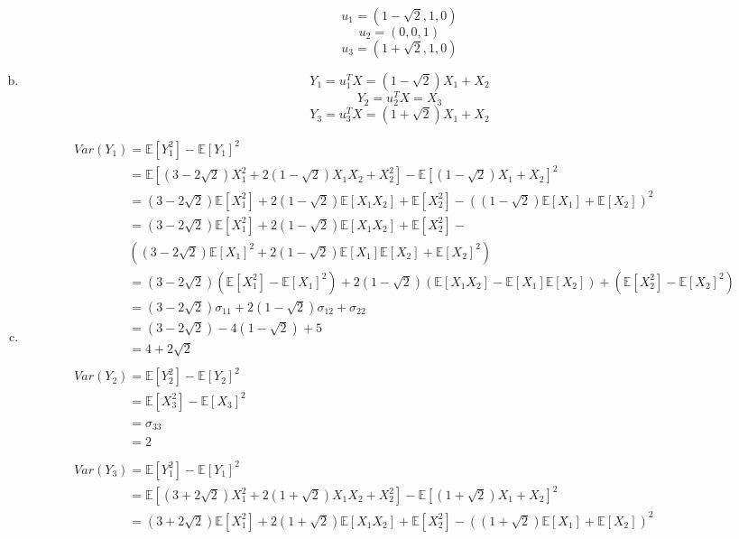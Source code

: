 \documentclass[11pt]{article}
\begin{document}
\begin{enumerate}[(a)]
		 \[u_1 = (1 - \sqrt{2}, 1, 0)\]
		 \[u_2 = (0, 0, 1)\]
		 \[u_3 = (1 + \sqrt{2}, 1, 0)\]
		\item 
		\[Y_1 = u^T_1 X = (1 - \sqrt{2})X_1 + X_2\]
		\[Y_2 = u^T_2 X = X_3\]
		\[Y_3 = u^T_3 X = (1 + \sqrt{2})X_1 + X_2\]
		\item
		\begin{align}
			&Var(Y_1) = \mathbb{E}[Y_1^2] - \mathbb{E}[Y_1]^2\nonumber\\ 
			&\phantom{Var(Y_1)} = \mathbb{E}[(3 - 2\sqrt{2})X_1^2 + 2(1 - \sqrt{2})X_1X_2 + X^2_2] - \mathbb{E}[(1 - \sqrt{2})X_1 + X_2]^2\nonumber\\
			&\phantom{Var(Y_1)} = (3 - 2\sqrt{2})\mathbb{E}[X_1^2] + 2(1 - \sqrt{2})\mathbb{E}[X_1X_2] + \mathbb{E}[X^2_2] - ((1 - \sqrt{2})\mathbb{E}[X_1] + \mathbb{E}[X_2])^2\nonumber\\
			&\phantom{Var(Y_1)} = (3 - 2\sqrt{2})\mathbb{E}[X_1^2] + 2(1 - \sqrt{2})\mathbb{E}[X_1X_2] + \mathbb{E}[X^2_2] - \nonumber\\
			&\phantom{Var(Y_1)} ((3 - 2\sqrt{2})\mathbb{E}[X_1]^2 + 2(1 - \sqrt{2})\mathbb{E}[X_1]\mathbb{E}[X_2] + \mathbb{E}[X_2]^2)\nonumber\\
			&\phantom{Var(Y_1)} = (3 - 2\sqrt{2})(\mathbb{E}[X^2_1] - \mathbb{E}[X_1]^2) + 2(1 - \sqrt{2})(\mathbb{E}[X_1X_2] - \mathbb{E}[X_1]\mathbb{E}[X_2]) + (\mathbb{E}[X^2_2] - \mathbb{E}[X_2]^2)\nonumber\\
			&\phantom{Var(Y_1)} = (3 - 2\sqrt{2})\sigma_{11} + 2(1 - \sqrt{2})\sigma_{12} + \sigma_{22}\nonumber\\
			&\phantom{Var(Y_1)} = (3 - 2\sqrt{2}) - 4(1 - \sqrt{2}) + 5\nonumber\\
			&\phantom{Var(Y_1)} = 4 + 2\sqrt{2}\nonumber\\
			&\nonumber\\
			&Var(Y_2) = \mathbb{E}[Y_2^2] - \mathbb{E}[Y_2]^2\nonumber\\ 
			&\phantom{Var(Y_2)} = \mathbb{E}[X_3^2] - \mathbb{E}[X_3]^2\nonumber\\
			&\phantom{Var(Y_2)} = \sigma_{33}\nonumber\\
			&\phantom{Var(Y_2)} = 2\nonumber\\
			&\nonumber\\
			&Var(Y_3) = \mathbb{E}[Y_1^2] - \mathbb{E}[Y_1]^2\nonumber\\ 
			&\phantom{Var(Y_3)} = \mathbb{E}[(3 + 2\sqrt{2})X_1^2 + 2(1 + \sqrt{2})X_1X_2 + X^2_2] - \mathbb{E}[(1 + \sqrt{2})X_1 + X_2]^2\nonumber\\
			&\phantom{Var(Y_3)} = (3 + 2\sqrt{2})\mathbb{E}[X_1^2] + 2(1 + \sqrt{2})\mathbb{E}[X_1X_2] + \mathbb{E}[X^2_2] - ((1 + \sqrt{2})\mathbb{E}[X_1] + \mathbb{E}[X_2])^2\nonumber\\

\end{align}
\end{enumerate}
\end{document}
